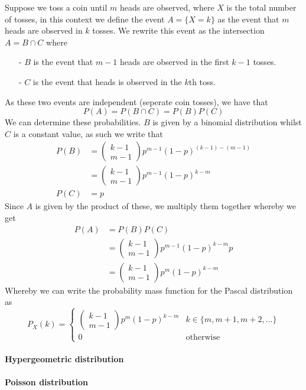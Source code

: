 Suppose we toss a coin until $m$ heads are observed, where $X$ is the total number of tosses, in this context we define the event $A=\{X=k\}$ as the event that $m$ heads are observed in $k$ tosses. We rewrite this event as the intersection $A=B\cap C$ where
\begin{itemize}
    \item[-] $B$ is the event that $m-1$ heads are observed in the first $k-1$ tosses.
    \item[-] $C$ is the event that heads is observed in the $k$th toss.
\end{itemize}
As these two events are independent (seperate coin tosses), we have that
\[
    P(A)=P(B\cap C)=P(B)P(C)
\]
We can determine these probabilities. $B$ is given by a binomial distribution whilst $C$ is a constant value, as such we write that
\begin{align*}
    P(B)&=\begin{pmatrix}k-1\\m-1\end{pmatrix}p^{m-1}(1-p)^{(k-1)-(m-1)} \\
        &=\begin{pmatrix}k-1\\m-1\end{pmatrix}p^{m-1}(1-p)^{k-m} \\
    P(C)&=p
\end{align*}
Since $A$ is given by the product of these, we multiply them together whereby we get
\begin{align*}
    P(A)&=P(B)P(C) \\
        &=\begin{pmatrix}k-1\\m-1\end{pmatrix}p^{m-1}(1-p)^{k-m}p \\
        &=\begin{pmatrix}k-1\\m-1\end{pmatrix}p^{m}(1-p)^{k-m}
\end{align*}
Whereby we can write the probability mass function for the Pascal distribution as
\[
    P_{X}(k)=\begin{cases}\begin{pmatrix}k-1\\m-1\end{pmatrix}p^{m}(1-p)^{k-m} & k\in\{m,m+1,m+2,\ldots\} \\ 0 & \text{otherwise}\end{cases}
\]
\paragraph{Hypergeometric distribution}
\paragraph{Poisson distribution}
